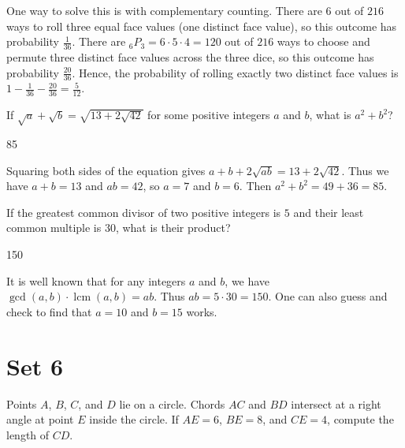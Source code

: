 \documentclass[11pt]{article}
\begin{document}
\begin{solution}
One way to solve this is with complementary counting. There are $6$ out of $216$ ways to roll three equal face values (one distinct face value), so this outcome has probability $\frac{1}{36}$. There are $_6P_3 = 6 \cdot 5 \cdot 4 = 120$ out of $216$ ways to choose and permute three distinct face values across the three dice, so this outcome has probability $\frac{20}{36}$. Hence, the probability of rolling exactly two distinct face values is $1 - \frac{1}{36} - \frac{20}{36} = \frac{5}{12}$.
\end{solution}


\begin{problem}%
If $\sqrt{a}+\sqrt{b} = \sqrt{13+2\sqrt{42}}$ for some positive integers $a$ and $b$, what is $a^2+b^2$?
\end{problem}

\begin{answer}
85
\end{answer}

\begin{solution}
Squaring both sides of the equation gives $a + b + 2\sqrt{ab} = 13 + 2\sqrt{42}$. Thus we have $a+b = 13$ and $ab = 42$, so $a = 7$ and $b = 6$. Then $a^2 + b^2 = 49 + 36 = 85$.
\end{solution}

\begin{problem}
If the greatest common divisor of two positive integers is $5$ and their least common multiple is $30$, what is their product?
\end{problem}

\begin{answer}
150
\end{answer}

\begin{solution}
It is well known that for any integers $a$ and $b$, we have $\gcd(a ,b) \cdot \operatorname{lcm}(a, b) = ab$. Thus $ab = 5 \cdot 30 = 150$. One can also guess and check to find that $a = 10$ and $b = 15$ works.
\end{solution}

\newpage

\section*{Set 6}

\begin{problem}
Points $A$, $B$, $C$, and $D$ lie on a circle. Chords $AC$ and $BD$ intersect at a right angle at point $E$ inside the circle. If $AE = 6$, $BE = 8$, and $CE = 4$, compute the length of $CD$.
\end{problem}
\end{document}
